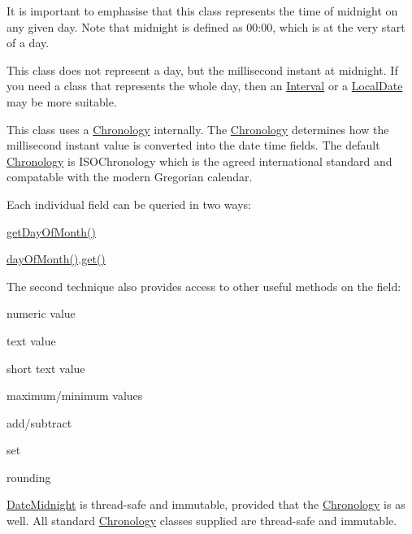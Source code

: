 It is important to emphasise that this class represents the time of midnight on any given day. Note that midnight is defined as 00\-:00, which is at the very start of a day. 

This class does not represent a day, but the millisecond instant at midnight. If you need a class that represents the whole day, then an \hyperlink{classorg_1_1joda_1_1time_1_1_interval}{Interval} or a \hyperlink{classorg_1_1joda_1_1time_1_1_local_date}{Local\-Date} may be more suitable. 

This class uses a \hyperlink{classorg_1_1joda_1_1time_1_1_chronology}{Chronology} internally. The \hyperlink{classorg_1_1joda_1_1time_1_1_chronology}{Chronology} determines how the millisecond instant value is converted into the date time fields. The default \hyperlink{classorg_1_1joda_1_1time_1_1_chronology}{Chronology} is {\ttfamily I\-S\-O\-Chronology} which is the agreed international standard and compatable with the modern Gregorian calendar.

Each individual field can be queried in two ways\-: 
\begin{DoxyItemize}
\item {\ttfamily \hyperlink{interfaceorg_1_1joda_1_1time_1_1_readable_date_time_a47bc461b2bfaa131ca55ef0c0765adc1}{get\-Day\-Of\-Month()}} 
\item {\ttfamily \hyperlink{classorg_1_1joda_1_1time_1_1_date_midnight_a051a9b4a5d9a944cabc3db73cc9d7417}{day\-Of\-Month()}.\hyperlink{classorg_1_1joda_1_1time_1_1base_1_1_abstract_date_time_af30504cd429178fe15ecf1df8684cc85}{get()}} 
\end{DoxyItemize}The second technique also provides access to other useful methods on the field\-: 
\begin{DoxyItemize}
\item numeric value 
\item text value 
\item short text value 
\item maximum/minimum values 
\item add/subtract 
\item set 
\item rounding 
\end{DoxyItemize}

\hyperlink{classorg_1_1joda_1_1time_1_1_date_midnight}{Date\-Midnight} is thread-\/safe and immutable, provided that the \hyperlink{classorg_1_1joda_1_1time_1_1_chronology}{Chronology} is as well. All standard \hyperlink{classorg_1_1joda_1_1time_1_1_chronology}{Chronology} classes supplied are thread-\/safe and immutable.

